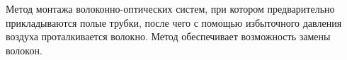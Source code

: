 Метод монтажа волоконно-оптических систем, при котором
предварительно прикладываются полые трубки, после чего с
помощью избыточного давления воздуха проталкивается волокно.
Метод обеспечивает возможность замены волокон.